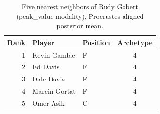 \begin{table}[htbp]
  \centering\small
  \begin{tabular}{rllc}
    \toprule
    Rank & Player & Position & Archetype \\
    \midrule
    1 & Kevin Gamble & F & 4 \\
    2 & Ed Davis & F & 4 \\
    3 & Dale Davis & F & 4 \\
    4 & Marcin Gortat & F & 4 \\
    5 & Omer Asik & C & 4 \\
    \bottomrule
  \end{tabular}
  \caption{Five nearest neighbors of Rudy Gobert (peak_value modality), Procrustes-aligned posterior mean.}
  \label{tab:Rudy_Gobert_neighbors_peak_value}
\end{table}

